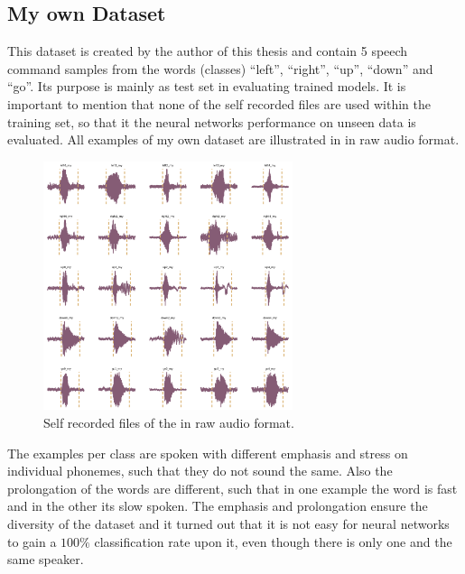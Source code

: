 
\subsection{My own Dataset}\label{sec:exp_dataset_my}
This dataset is created by the author of this thesis and contain 5 speech command samples from the words (classes) \enquote{left}, \enquote{right}, \enquote{up}, \enquote{down} and \enquote{go}.
Its purpose is mainly as test set in evaluating trained models.
It is important to mention that none of the self recorded files are used within the training set, so that it the neural networks performance on unseen data is evaluated.
All examples of my own dataset are illustrated in  in raw audio format.
\begin{figure}[!ht]
  \centering
    \includegraphics[width=0.65\textwidth]{./5_exp/figs/exp_dataset_wav_grid_my}
  \caption{Self recorded files of the  in raw audio format.}
  \label{fig:exp_dataset_wav_grid_my}
\end{figure}
\FloatBarrier
\noindent
The examples per class are spoken with different emphasis and stress on individual phonemes, such that they do not sound the same.
Also the prolongation of the words are different, such that in one example the word is fast and in the other its slow spoken.
The emphasis and prolongation ensure the diversity of the dataset and it turned out that it is not easy for neural networks to gain a $100\%$ classification rate upon it, even though there is only one and the same speaker.
